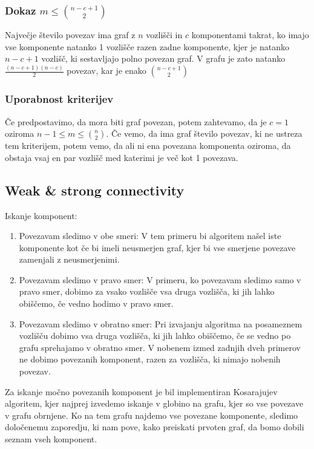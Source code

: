 \documentclass[a4paper,11pt]{article}
\begin{document}
\subsubsection{Dokaz $m \leq {{n-c+1}\choose{2}}$}

Največje število povezav ima graf z $n$ vozlišči in $c$ komponentami takrat, ko imajo vse komponente natanko 1 vozlišče razen zadne komponente, kjer je natanko $n-c+1$ vozlišč, ki sestavljajo polno povezan graf. V grafu je zato natanko $\frac{(n-c+1)(n-c)}{2}$ povezav, kar je enako ${n-c+1}\choose{2}$

\subsubsection{Uporabnost kriterijev}

Če predpostavimo, da mora biti graf povezan, potem zahtevamo, da je $c=1$ oziroma  $n-1 \leq m \leq {{n}\choose{2}}$. Če vemo, da ima graf število povezav, ki ne ustreza tem kriterijem, potem vemo, da ali ni ena povezana komponenta oziroma, da obstaja vsaj en par vozlišč med katerimi je več kot 1 povezava.

\subsection{Weak \& strong connectivity}

Iskanje komponent:
\begin{enumerate}
\item Povezavam sledimo v obe smeri: V tem primeru bi algoritem našel iste komponente kot če bi imeli neusmerjen graf, kjer bi vse smerjene povezave zamenjali z neusmerjenimi.
\item Povezavam sledimo v pravo smer: V primeru, ko povezavam sledimo samo v pravo smer, dobimo za vsako vozlišče vsa druga vozlišča, ki jih lahko obiščemo, če vedno hodimo v pravo smer.
\item Povezavam sledimo v obratno smer: Pri izvajanju algoritma na posameznem vozlišču dobimo vsa druga vozlišča, ki jih lahko obiščemo, če se vedno po grafu sprehajamo v obratno smer. V nobenem izmed zadnjih dveh primerov ne dobimo povezanih komponent, razen za vozlišča, ki nimajo nobenih povezav.

\end{enumerate}
Za iskanje močno povezanih komponent je bil implementiran Kosarajujev algoritem, kjer najprej izvedemo iskanje v globino na grafu, kjer so vse povezave v grafu obrnjene. Ko na tem grafu najdemo vse povezane komponente, sledimo določenemu zaporedju, ki nam pove, kako preiskati prvoten graf, da bomo dobili seznam vseh komponent.
\end{document}
